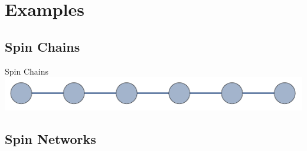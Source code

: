 \documentclass{beamer}
\begin{document}
\section{Examples}
\subsection{Spin Chains}
\begin{frame}[t]{Spin Chains}
	\includegraphics[trim=0 0 0 0, width=\textwidth]{Images/chain6_nolabels}
\end{frame}

\subsection{Spin Networks}
\end{document}
